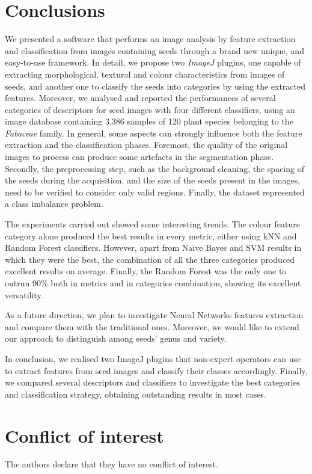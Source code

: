 \documentclass{svjour3}                     %
\begin{document}

\section{Conclusions}
We presented a software that performs an image analysis by feature extraction and classification from images containing seeds through a brand new unique, and easy-to-use framework. In detail, we propose two \emph{ImageJ} plugins, one capable of extracting morphological, textural and colour characteristics from images of seeds, and another one to classify the seeds into categories by using the extracted features. 
Moreover, we analysed and reported the performances of several categories of descriptors for seed images with four different classifiers, using an image database containing 3,386 samples of 120 plant species belonging to the \emph{Fabaceae} family. 
In general, some aspects can strongly influence both the feature extraction and the classification phases. Foremost, the quality of the original images to process can produce some artefacts in the segmentation phase. Secondly, the preprocessing step, such as the background cleaning, the spacing of the seeds during the acquisition, and the size of the seeds present in the images, need to be verified to consider only valid regions. Finally, the dataset represented a class imbalance problem.

The experiments carried out showed some interesting trends. The colour feature category alone produced the best results in every metric, either using kNN and Random Forest classifiers. However, apart from Naive Bayes and SVM results in which they were the best, the combination of all the three categories produced excellent results on average. Finally, the Random Forest was the only one to outrun 90\% both in metrics and in categories combination, showing its excellent versatility.

As a future direction, we plan to investigate Neural Networks features extraction and compare them with the traditional ones. Moreover, we would like to extend our approach to distinguish among seeds' genus and variety.

In conclusion, we realised two ImageJ plugins that non-expert operators can use to extract features from seed images and classify their classes accordingly. Finally, we compared several descriptors and classifiers to investigate the best categories and classification strategy, obtaining outstanding results in most cases.



\section*{Conflict of interest}
The authors declare that they have no conflict of interest.



\end{document}
